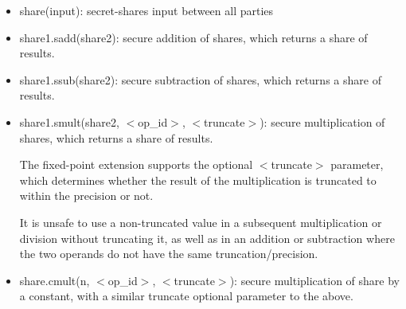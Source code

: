 \documentclass[11pt, oneside]{article}   	%
\begin{document}
\begin{itemize}
\item share(input): secret-shares input between all parties
\item share1.sadd(share2): secure addition of shares, which returns a share of results.
\item share1.ssub(share2): secure subtraction of shares, which returns a share of results.
\item share1.smult(share2, $<$op\_id$>$, $<$truncate$>$): secure multiplication of shares, which returns a share of results.

The fixed-point extension supports the optional $<$truncate$>$ parameter, which determines whether the result of the multiplication is truncated to within the precision or not.

It is unsafe to use a non-truncated value in a subsequent multiplication or division without truncating it, as well as in an addition or subtraction where the two operands do not have the same truncation/precision.
\item share.cmult(n, $<$op\_id$>$, $<$truncate$>$): secure multiplication of share by a constant, with a similar truncate optional parameter to the above.
\end{itemize}
\end{document}
